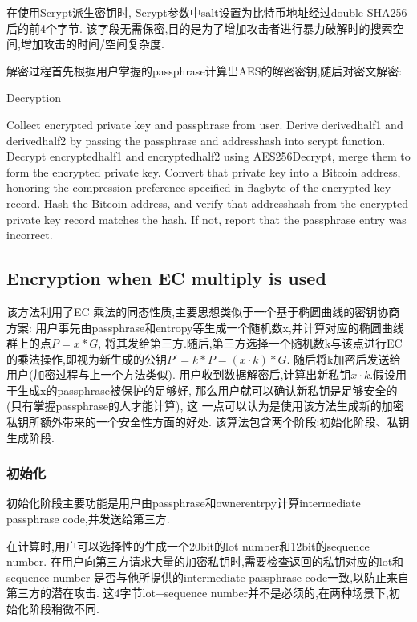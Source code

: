 在使用Scrypt派生密钥时, Scrypt参数中salt设置为比特币地址经过double-SHA256后的前4个字节.
该字段无需保密,目的是为了增加攻击者进行暴力破解时的搜索空间,增加攻击的时间/空间复杂度.



解密过程首先根据用户掌握的passphrase计算出AES的解密密钥,随后对密文解密:

\begin{algorithm}[tbp]\footnotesize
\caption{Decryption}
  	\begin{algorithmic}[1]
	    \STATE Collect encrypted private key and passphrase from user.  
		\STATE Derive derivedhalf1 and derivedhalf2 by passing the passphrase and addresshash into scrypt function.
		\STATE Decrypt encryptedhalf1 and encryptedhalf2 using AES256Decrypt, merge them to form the encrypted private key. 
		\STATE Convert that private key into a Bitcoin address, honoring the compression preference specified in flagbyte of the encrypted key record.
		\STATE Hash the Bitcoin address, and verify that addresshash from the encrypted private key record matches the hash. If not, report that the passphrase entry was incorrect.  
    \end{algorithmic}
\end{algorithm}


\subsection{Encryption when EC multiply is used}

该方法利用了EC 乘法的同态性质,主要思想类似于一个基于椭圆曲线的密钥协商方案:
用户事先由passphrase和entropy等生成一个随机数x,并计算对应的椭圆曲线群上的点$P=x*G$,
将其发给第三方.随后,第三方选择一个随机数k与该点进行EC的乘法操作,即视为新生成的公钥$P'=k*P=(x \cdot k)*G$.
随后将k加密后发送给用户(加密过程与上一个方法类似).
用户收到数据解密后,计算出新私钥$x\cdot k$.假设用于生成x的passphrase被保护的足够好,
那么用户就可以确认新私钥是足够安全的(只有掌握passphrase的人才能计算), 这
一点可以认为是使用该方法生成新的加密私钥所额外带来的一个安全性方面的好处.
该算法包含两个阶段:初始化阶段、私钥生成阶段.

\subsubsection{初始化}
初始化阶段主要功能是用户由passphrase和ownerentrpy计算intermediate passphrase code,并发送给第三方.  

在计算时,用户可以选择性的生成一个20bit的lot number和12bit的sequence number.
在用户向第三方请求大量的加密私钥时,需要检查返回的私钥对应的lot和sequence number
是否与他所提供的intermediate passphrase code一致,以防止来自第三方的潜在攻击.
这4字节lot+sequence number并不是必须的,在两种场景下,初始化阶段稍微不同. 
 
